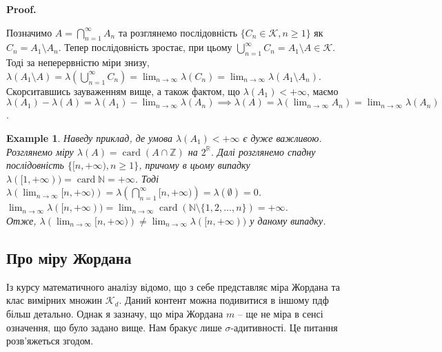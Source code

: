 \documentclass[a4paper, 10pt]{article}
\makeatletter
\theoremstyle{theoremdd}
\newtheorem{example}[theorem]{Example}
\DeclareMathOperator{\card}{card}
\renewenvironment{proof}[1][Proof.\\]{\par
\pushQED{\hfill \qed}%
\normalfont \topsep6\p@\@plus6\p@\relax
\trivlist
\item\relax
{\bfseries
#1\@addpunct{.}}\hspace\labelsep\ignorespaces
}{%
\popQED\endtrivlist\@endpefalse
}
\makeatother
\begin{document}
\begin{proof}
Позначимо $A = \displaystyle\bigcap_{n=1}^\infty A_n$ та розглянемо послідовність $\{C_n \in \mathcal{K}, n \geq 1\}$ як $C_n = A_1 \setminus A_n$. Тепер послідовність зростає, при цьому $\displaystyle\bigcup_{n=1}^\infty C_n = A_1 \setminus A \in \mathcal{K}$. Тоді за неперервністю міри знизу,\\
$\lambda(A_1 \setminus A) = \displaystyle\lambda\left( \bigcup_{n=1}^\infty C_n \right) = \lim_{n \to \infty} \lambda\left(C_n\right) = \lim_{n \to \infty} \lambda(A_1 \setminus A_n)$.\\
Скорситавшись зауваженням вище, а також фактом, що $\lambda(A_1) < +\infty$, маємо\\
$\displaystyle\lambda(A_1) - \lambda(A) = \lambda(A_1) - \lim_{n \to \infty} \lambda(A_n) \implies \lambda(A) = \lambda\left( \lim_{n \to \infty} A_n \right) = \lim_{n \to \infty} \lambda(A_n)$.
\end{proof}

\begin{example}
Наведу приклад, де умова $\lambda(A_1) < +\infty$ є дуже важливою.\\
Розглянемо міру $\lambda(A) = \card (A \cap \mathbb{Z})$ на $2^{\mathbb{R}}$. Далі розглянемо спадну послідовність $\{ [n,+\infty), n \geq 1 \}$, причому в цьому випадку $\lambda([1,+\infty)) = \card \mathbb{N} = +\infty$. Тоді\\
$\displaystyle\lambda\left( \lim_{n \to \infty} [n,+\infty) \right) = \lambda\left( \bigcap_{n=1}^\infty [n,+\infty) \right) = \lambda(\emptyset) = 0$.\\
$\displaystyle\lim_{n \to \infty} \lambda([n,+\infty)) = \lim_{n \to \infty} \card (\mathbb{N} \setminus \{1,2,\dots,n\}) = +\infty$.\\
Отже, $\displaystyle\lambda\left( \lim_{n \to \infty} [n,+\infty) \right) \neq \lim_{n \to \infty} \lambda([n,+\infty))$ у даному випадку.
\end{example}

\subsection{Про міру Жордана}
Із курсу математичного аналізу відомо, що з себе представляє міра Жордана та клас вимірних множин $\mathcal{K}_d$. Даний контент можна подивитися в іншому пдф більш детально. Однак я зазначу, що міра Жордана $m$ -- ще не міра в сенсі означення, що було задано вище. Нам бракує лише $\sigma$-адитивності. Це питання розв'яжеться згодом.
\end{document}
